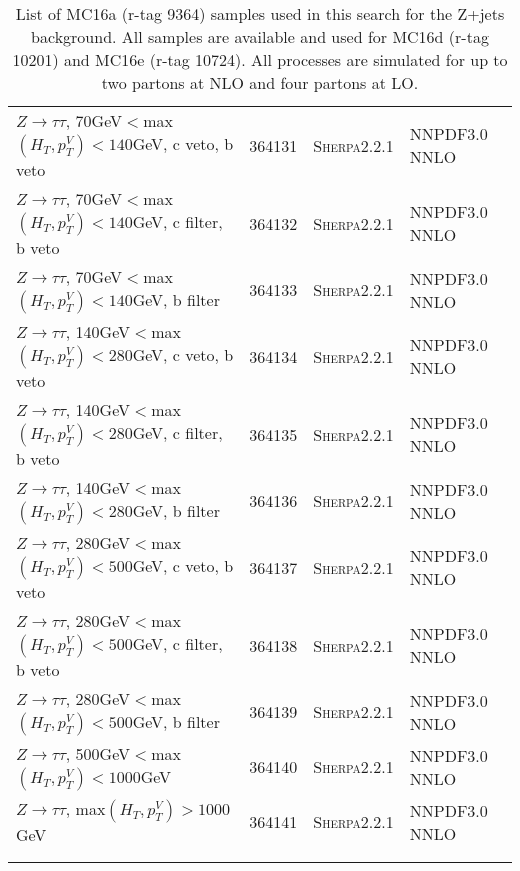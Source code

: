 \begin{table}[h!]
\begin{center}
{\begin{tabular}{@{} lcll @{}}
$Z\rightarrow \tau\tau$, 70GeV$<$max$(H_T,p_T^V)<140$GeV, c veto, b veto & 364131& \textsc{Sherpa2.2.1} &NNPDF3.0 NNLO \\
$Z\rightarrow \tau\tau$, 70GeV$<$max$(H_T,p_T^V)<140$GeV, c filter, b veto & 364132& \textsc{Sherpa2.2.1} &NNPDF3.0 NNLO \\
$Z\rightarrow \tau\tau$, 70GeV$<$max$(H_T,p_T^V)<140$GeV, b filter & 364133& \textsc{Sherpa2.2.1} &NNPDF3.0 NNLO \\
$Z\rightarrow \tau\tau$, 140GeV$<$max$(H_T,p_T^V)<280$GeV, c veto, b veto & 364134&  \textsc{Sherpa2.2.1} &NNPDF3.0 NNLO \\
$Z\rightarrow \tau\tau$, 140GeV$<$max$(H_T,p_T^V)<280$GeV, c filter, b veto & 364135& \textsc{Sherpa2.2.1} &NNPDF3.0 NNLO \\
$Z\rightarrow \tau\tau$, 140GeV$<$max$(H_T,p_T^V)<280$GeV, b filter & 364136& \textsc{Sherpa2.2.1} &NNPDF3.0 NNLO \\
$Z\rightarrow \tau\tau$, 280GeV$<$max$(H_T,p_T^V)<500$GeV, c veto, b veto & 364137& \textsc{Sherpa2.2.1} &NNPDF3.0 NNLO \\
$Z\rightarrow \tau\tau$, 280GeV$<$max$(H_T,p_T^V)<500$GeV, c filter, b veto & 364138& \textsc{Sherpa2.2.1} &NNPDF3.0 NNLO \\
$Z\rightarrow \tau\tau$, 280GeV$<$max$(H_T,p_T^V)<500$GeV, b filter &  364139& \textsc{Sherpa2.2.1} &NNPDF3.0 NNLO \\
$Z\rightarrow \tau\tau$, 500GeV$<$max$(H_T,p_T^V)<1000$GeV & 364140& \textsc{Sherpa2.2.1} &NNPDF3.0 NNLO \\
$Z\rightarrow \tau\tau$, max$(H_T,p_T^V)>1000$GeV&  364141&  	 \textsc{Sherpa2.2.1} &NNPDF3.0 NNLO \\	\\
 \hhline{====}
\end{tabular}
\caption{List of MC16a (r-tag  9364) samples used in this search for the Z+jets background.  All samples are available and used for MC16d (r-tag 10201) and MC16e (r-tag 10724). All processes are simulated for up to two partons at NLO and four partons at LO.}
\label{tab:MCSample4}
}
\end{center}
\end{table}

